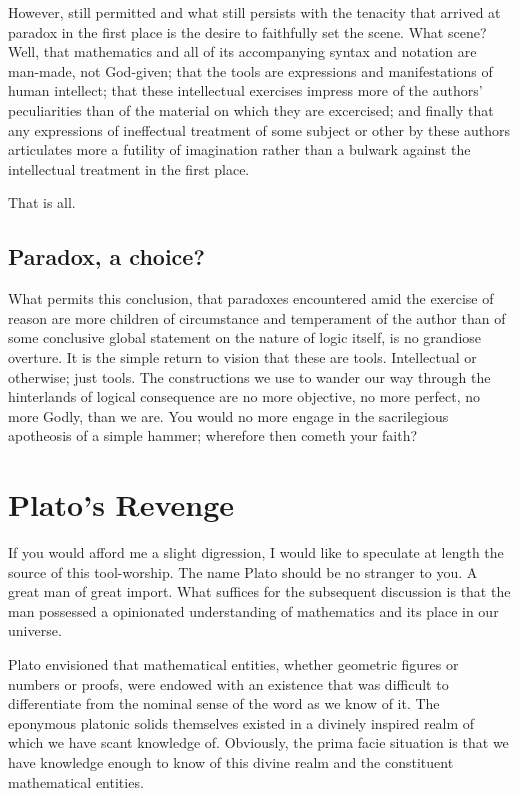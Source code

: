 \documentclass{article}
\begin{document}
	However, still permitted and what still persists with the tenacity that arrived at paradox in the first place is the desire to faithfully set the scene. What scene? Well, that mathematics and all of its accompanying syntax and notation are man-made, not God-given; that the tools are expressions and manifestations of human intellect; that these intellectual exercises impress more of the authors' peculiarities than of the material on which they are excercised; and finally that any expressions of ineffectual treatment of some subject or other by these authors articulates more a futility of imagination rather than a bulwark against the intellectual treatment in the first place.
	
	That is all.
	
	\subsection{Paradox, a choice?}
	
	What permits this conclusion, that paradoxes encountered amid the exercise of reason are more children of circumstance and temperament of the author than of some conclusive global statement on the nature of logic itself, is no grandiose overture. It is the simple return to vision that these are tools. Intellectual or otherwise; just tools. The constructions we use to wander our way through the hinterlands of logical consequence are no more objective, no more perfect, no more Godly, than we are. You would no more engage in the sacrilegious apotheosis of a simple hammer; wherefore then cometh your faith?
	
	\section{Plato's Revenge}
	
	If you would afford me a slight digression, I would like to speculate at length the source of this tool-worship. The name Plato should be no stranger to you. A great man of great import. What suffices for the subsequent discussion is that the man possessed a opinionated understanding of mathematics and its place in our universe.
	
	Plato envisioned that mathematical entities, whether geometric figures or numbers or proofs, were endowed with an existence that was difficult to differentiate from the nominal sense of the word as we know of it. The eponymous platonic solids themselves existed in a divinely inspired realm of which we have scant knowledge of. Obviously, the prima facie situation is that we have knowledge enough to know of this divine realm and the constituent mathematical entities.
	
\end{document}
